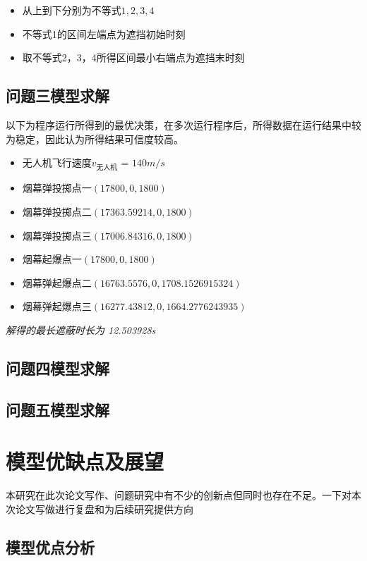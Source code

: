 \documentclass{article}
\begin{document}
\begin{itemize}
    \item 从上到下分别为不等式$1,2,3,4$
    \item 不等式1的区间左端点为遮挡初始时刻
    \item 取不等式2，3，4所得区间最小右端点为遮挡末时刻
\end{itemize}
\subsection{问题三模型求解}
以下为程序运行所得到的最优决策，在多次运行程序后，所得数据在运行结果中较为稳定，因此认为所得结果可信度较高。

\begin{itemize}
    \item 无人机飞行速度$v_\text{无人机}$ = $140 m/s$
    \item 烟幕弹投掷点一$(17800,0,1800)$
    \item 烟幕弹投掷点二$(17363.59214,0,1800)$
    \item 烟幕弹投掷点三$(17006.84316,0,1800)$
    \item 烟幕起爆点一$(17800,0,1800)$
    \item 烟幕弹起爆点二$(16763.5576,0,1708.1526915324)$
    \item 烟幕弹起爆点三$(16277.43812,0,1664.2776243935)$
\end{itemize}

\textit{解得的最长遮蔽时长为 12.503928s}

\subsection{问题四模型求解}

\subsection{问题五模型求解}

\section{模型优缺点及展望}
本研究在此次论文写作、问题研究中有不少的创新点但同时也存在不足。一下对本次论文写做进行复盘和为后续研究提供方向

\subsection{模型优点分析}
\end{document}
